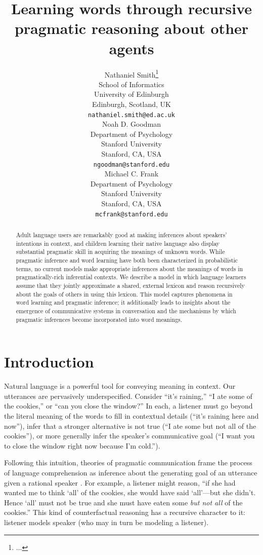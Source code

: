 \documentclass{article} %
\title{Learning words through recursive pragmatic reasoning about other agents}
\author{
Nathaniel Smith\thanks{...} \\
School of Informatics\\
University of Edinburgh\\
Edinburgh, Scotland, UK\\
\texttt{nathaniel.smith@ed.ac.uk} \\
\AND
Noah D. Goodman \\
Department of Psychology\\
Stanford University \\
Stanford, CA, USA \\
\texttt{ngoodman@stanford.edu} \\
\And
Michael C. Frank \\
Department of Psychology \\
Stanford University \\
Stanford, CA, USA \\
\texttt{mcfrank@stanford.edu}}
\begin{document}
\maketitle

\begin{abstract}
  Adult language users are remarkably good at making inferences about speakers' intentions in context, and children learning their native language also display substantial pragmatic skill in acquiring the meanings of unknown words. While pragmatic inference and word learning have both been characterized in probabilistic terms, no current models make appropriate inferences about the meanings of words in pragmatically-rich inferential contexts. We describe a model in which language learners assume that they jointly approximate a shared, external lexicon and reason recursively about the goals of others in using this lexicon. This model captures phenomena in word learning and pragmatic inference; it additionally leads to insights about the emergence of communicative systems in conversation and the mechanisms by which pragmatic inferences become incorporated into word meanings.
\end{abstract}

\section{Introduction}

Natural language is a powerful tool for conveying meaning in context. Our utterances are pervasively underspecified. Consider ``it's raining,'' ``I ate some of the cookies,'' or ``can you close the window?'' In each, a listener must go beyond the literal meaning of the words to fill in contextual details (``it's raining here and now''), infer that a stronger alternative is not true (``I ate some but not all of the cookies''), or more generally infer the speaker's communicative goal (``I want you to close the window right now because I'm cold.'').

Following this intuition, theories of pragmatic communication frame the process of language comprehension as inference about the generating goal of an utterance given a rational speaker \cite{grice1975,dale1995,frank2012}. For example, a listener might reason, ``if she had wanted me to think `all' of the cookies, she would have said `all'---but she didn't. Hence `all' must not be true and she must have eaten some {\it but not all} of the cookies.'' This kind of counterfactual reasoning has a recursive character to it: listener models speaker (who may in turn be modeling a listener).
\end{document}
